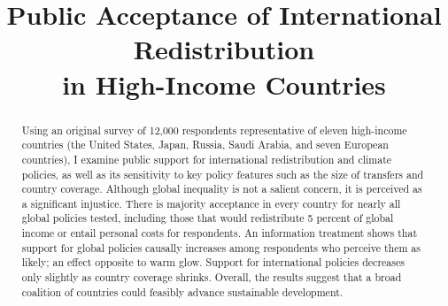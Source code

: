 \documentclass[12pt,english]{article}
\title{Public Acceptance of
International Redistribution\\
in High-Income Countries}
\date{}
\begin{document}
\maketitle

\begin{abstract}

Using an original survey of 12,000 respondents representative of eleven high-income countries (the United States, Japan, Russia, Saudi Arabia, and seven European countries), I examine public support for international redistribution and climate policies, as well as its sensitivity to key policy features such as the size of transfers and country coverage. Although global inequality is not a salient concern, it is perceived as a significant injustice. There is majority acceptance in every country for nearly all global policies tested, including those that would redistribute 5 percent of global income or entail personal costs for respondents. An information treatment shows that support for global policies causally increases among respondents who perceive them as likely; an effect opposite to warm glow. Support for international policies decreases only slightly as country coverage shrinks. Overall, the results suggest that a broad coalition of countries could feasibly advance sustainable development.

\end{abstract}

\clearpage

\doublespacing

\end{document}
